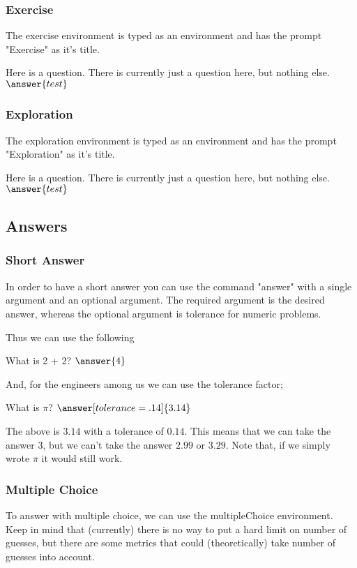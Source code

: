 \documentclass{ximera}
\begin{document}
\subsubsection{Exercise}
The exercise environment is typed as an environment and has the prompt "Exercise" as it's title. 

\begin{exercise}
Here is a question. There is currently just a question here, but nothing else.
$\answer{test}$
\end{exercise}


\subsubsection{Exploration}
The exploration environment is typed as an environment and has the prompt "Exploration" as it's title. 

\begin{exploration}
Here is a question. There is currently just a question here, but nothing else.
$\answer{test}$
\end{exploration}

\subsection{Answers}

\subsubsection{Short Answer}
In order to have a short answer you can use the command "answer" with a single argument and an optional argument. The required argument is the desired answer, whereas the optional argument is tolerance for numeric problems.

Thus we can use the following

\begin{problem}
What is 2 + 2? 
$\answer{4}$
\end{problem}

And, for the engineers among us we can use the tolerance factor;
\begin{problem}
What is $\pi$?
$\answer[tolerance=.14]{3.14}$
\end{problem}
The above is $3.14$ with a tolerance of $0.14$. This means that we can take the answer 3, but we can't take the answer $2.99$ or $3.29$. Note that, if we simply wrote $\pi$ it would still work.

\subsubsection{Multiple Choice}
To answer with multiple choice, we can use the multipleChoice environment. Keep in mind that (currently) there is no way to put a hard limit on number of guesses, but there are some metrics that could (theoretically) take number of guesses into account. 
\end{document}
